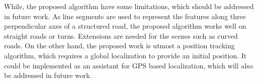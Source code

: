 \documentclass[letterpaper, 10 pt, conference]{ieeeconf}  %
\begin{document}
While, the proposed algorithm have some limitations, which should be addressed in future work. As line segments are used to represent the features along three perpendicular axes of a structured road, the proposed algorithm works well on straight roads or turns. Extensions are needed for the scenes such as curved roads. On the other hand, the proposed work is utmost a position tracking algorithm, which requires a global localization to provide an initial position. It could be implemented as an assistant for GPS based localization, which will also be addressed in future work.



\end{document}
